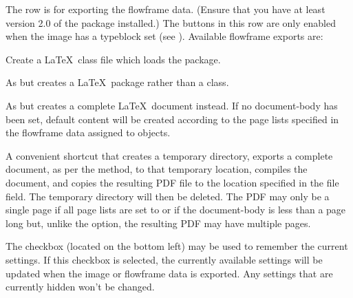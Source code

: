The  row is for exporting the
\gls{flowframe} data. (Ensure that you have at least version 2.0 of
the  package installed.) The buttons in this row are only enabled when
the image has a \gls{typeblock} set
(see ). Available \gls{flowframe}
exports are:
\begin{deflist}

\begin{itemdesc}
Create a \LaTeX\ class file which loads the  package.
\end{itemdesc}


\begin{itemdesc}
As  but creates a \LaTeX\ package rather than a
class.
\end{itemdesc}


\begin{itemdesc}
As  but creates a complete \LaTeX\ document instead.
If no \gls{document-body} has been set, default content will be
created according to the page lists specified in the \gls{flowframe}
data assigned to \glspl{object}.
\end{itemdesc}


\begin{itemdesc}
A convenient shortcut that creates a temporary directory, 
exports a complete document, as per the  method, to that
temporary location, compiles the document, and copies the resulting
PDF file to the location specified in the file field. The temporary
directory will then be deleted.
The PDF may only be a single page if all page lists are set to
 or if the \gls{document-body} is less than a page long but, 
unlike the  option,
the resulting PDF may have multiple pages.
\end{itemdesc}
\end{deflist}


The  checkbox (located on the bottom left)
may be used to remember the current settings. If this checkbox is
selected, the currently available settings will be updated when the
image or \gls{flowframe} data is exported. Any settings that are
currently hidden won't be changed.

